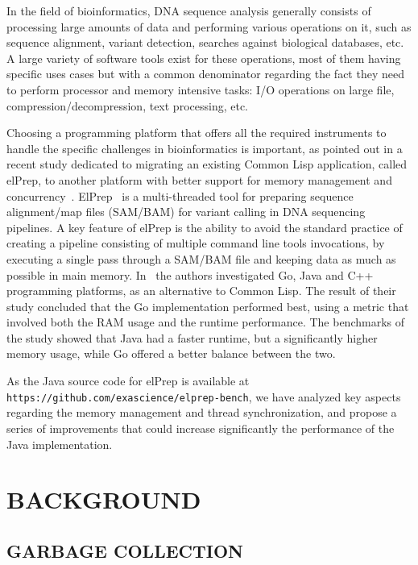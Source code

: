 \documentclass[a4paper,twoside]{article}
\begin{document}
In the field of bioinformatics, DNA sequence analysis generally consists of processing large amounts of data and performing
various operations on it,
such as sequence alignment, variant detection, searches against biological databases, etc.
A large variety of software tools exist for these operations, most of them having specific uses cases but with a common
denominator regarding the fact they need to perform processor and memory intensive tasks: I/O operations on large file,
compression/decompression, text processing, etc.

Choosing a programming platform that offers all the required instruments to handle the specific challenges in
bioinformatics is important,
as pointed out in a recent study dedicated to migrating an existing Common Lisp application, called elPrep, 
to another platform with better support for memory management and concurrency~\cite{costanza:2019}.
ElPrep~\cite{herzeel:2019} is a multi-threaded tool for preparing sequence alignment/map files (SAM/BAM)
for variant calling in DNA sequencing pipelines. 
A key feature of elPrep is the ability to avoid the standard practice of creating a pipeline consisting of multiple
command line tools invocations,
by executing a single pass through a SAM/BAM file and keeping data as much as possible in main memory.
In~\cite{costanza:2019} the authors investigated Go, Java and C++ programming platforms, as an alternative to Common Lisp.
The result of their study concluded that the Go implementation performed best, using a metric that involved both the
RAM usage and the runtime performance.
The benchmarks of the study showed that Java had a faster runtime, but a significantly higher memory usage, while Go
offered a better balance between the two.

As the Java source code for elPrep is available at {\texttt{https://github.com/exascience/elprep-bench}}, we have
analyzed key aspects regarding the memory management and thread synchronization, and propose a series of improvements
that could increase significantly the performance of the Java implementation.


\section{\uppercase{Background}}
\label{background}

\subsection{\uppercase{Garbage Collection}}
\label{background:gc}
\end{document}

